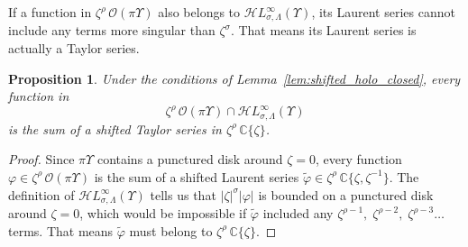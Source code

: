 \documentclass{article}
\newcommand{\singexp}[2]{\mathcal{H}L^\infty_{#1, #2}}
\newcommand{\C}{\mathbb{C}}
\newcommand{\series}[1]{\tilde{#1}}
\theoremstyle{definition}
\theoremstyle{plain}
\newtheorem{prop}[definition]{Proposition}
\begin{document}
If a function in $\zeta^\rho\,\mathcal{O}(\pi \Upsilon)$ also belongs to $\singexp{\sigma}{\Lambda}(\Upsilon)$, its Laurent series cannot include any terms more singular than $\zeta^\sigma$. That means its Laurent series is actually a Taylor series.
\begin{prop}\label{prop:shifted_holo_series}
Under the conditions of Lemma~\ref{lem:shifted_holo_closed}, every function in
\[ \zeta^\rho\,\mathcal{O}(\pi \Upsilon) \cap \singexp{\sigma}{\Lambda}(\Upsilon) \]
is the sum of a shifted Taylor series in $\zeta^\rho\,\C\{\zeta\}$.
\end{prop}
\begin{proof}
Since $\pi \Upsilon$ contains a punctured disk around $\zeta = 0$, every function $\varphi \in \zeta^\rho\,\mathcal{O}(\pi \Upsilon)$ is the sum of a shifted Laurent series $\series{\varphi} \in \zeta^\rho\,\C\{\zeta, \zeta^{-1}\}$. The definition of $\singexp{\sigma}{\Lambda}(\Upsilon)$ tells us that $|\zeta|^\sigma |\varphi|$ is bounded on a punctured disk around $\zeta = 0$, which would be impossible if $\series{\varphi}$ included any $\zeta^{\rho-1},\;\zeta^{\rho-2},\;\zeta^{\rho-3}\ldots$ terms. That means $\series{\varphi}$ must belong to $\zeta^\rho\,\C\{\zeta\}$.
\end{proof}
\end{document}
